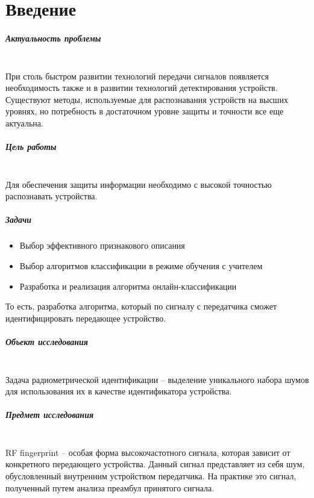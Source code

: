 \chapter{Введение}
\label{chap:intro}
	\paragraph{Актуальность проблемы} 
	\noindent \\
    	При столь быстром развитии технологий передачи сигналов появляется необходимость также и в развитии технологий детектирования устройств. Существуют методы, используемые для распознавания устройств на высших уровнях, но потребность в достаточном уровне защиты и точности все еще актуальна. 
	
	\paragraph{Цель работы}
	\noindent\\
	    Для обеспечения защиты информации необходимо с высокой точностью распознавать устройства.
	    
	\paragraph{Задачи} 
	\noindent 
	\begin{itemize}
	    \item Выбор эффективного признакового описания
	    \item Выбор алгоритмов классификации в режиме обучения с учителем
	    \item Разработка и реализация алгоритма онлайн-классификации
	\end{itemize}
    	То есть, разработка алгоритма, который по сигналу с передатчика сможет идентифицировать передающее устройство.
    	
	\paragraph{Объект исследования}
	\noindent \\
    	Задача радиометрической идентификации – выделение уникального набора шумов для использования их в качестве идентификатора устройства.
    	
	\paragraph{Предмет исследования} 
	\noindent \\
    	RF fingerprint – особая форма высокочастотного сигнала, которая зависит от конкретного передающего устройства. Данный сигнал представляет из себя шум, обусловленный внутренним устройством передатчика. На практике это сигнал, полученный путем анализа преамбул принятого сигнала.
    \newpage	
